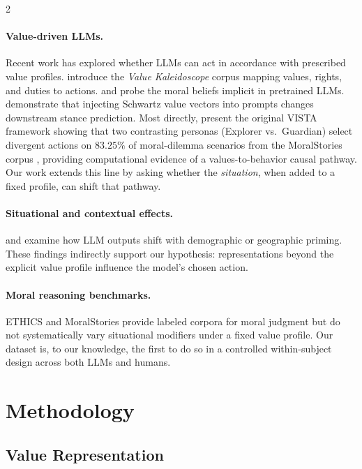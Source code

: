 \documentclass[11pt]{article}
\begin{document}
\begin{multicols}{2}
\paragraph{Value-driven LLMs.} Recent work has explored whether LLMs can act in accordance with prescribed value profiles. \citet{sorensen2024value} introduce the \emph{Value Kaleidoscope} corpus mapping values, rights, and duties to actions. \citet{abdulhai2023moral} and \citet{scherrer2023evaluating} probe the moral beliefs implicit in pretrained LLMs. \citet{kang2023values} demonstrate that injecting Schwartz value vectors into prompts changes downstream stance prediction. Most directly, \citet{vista2025} present the original VISTA framework showing that two contrasting personas (Explorer vs.\ Guardian) select divergent actions on $83.25\%$ of moral-dilemma scenarios from the MoralStories corpus \citep{emelin2021moral}, providing computational evidence of a values-to-behavior causal pathway. Our work extends this line by asking whether the \emph{situation}, when added to a fixed profile, can shift that pathway.

\paragraph{Situational and contextual effects.} \citet{santurkar2023whose} and \citet{durmus2023globalopinionqa} examine how LLM outputs shift with demographic or geographic priming. These findings indirectly support our hypothesis: representations beyond the explicit value profile influence the model's chosen action.

\paragraph{Moral reasoning benchmarks.} ETHICS \citep{hendrycks2021ethics} and MoralStories \citep{emelin2021moral} provide labeled corpora for moral judgment but do not systematically vary situational modifiers under a fixed value profile. Our dataset is, to our knowledge, the first to do so in a controlled within-subject design across both LLMs and humans.

\section{Methodology}
\label{sec:method}

\subsection{Value Representation}


\end{multicols}
\end{document}
